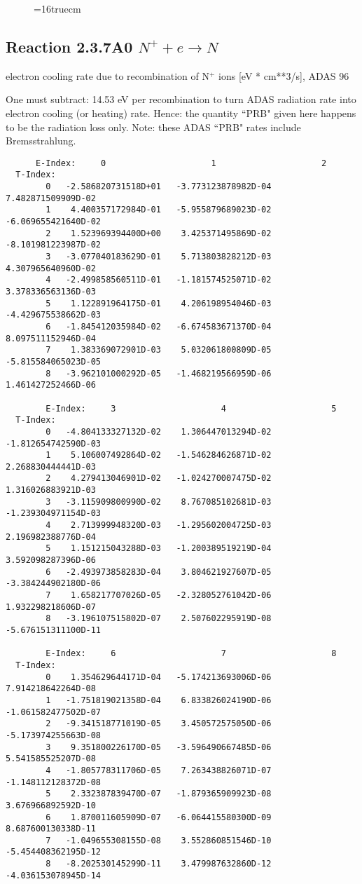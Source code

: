 \documentclass[12pt,dvipdfmx]{article}
\begin{document}
\begin{figure} \label{2.3.6rl}
\epsfxsize=16truecm
\end{figure}


\subsection{
  Reaction 2.3.7A0  $N^+ + e \rightarrow N   $
}
electron cooling rate due to recombination of N$^+$ ions [eV *
cm**3/s], ADAS 96

One must subtract: 14.53 eV per recombination to turn ADAS radiation
rate into electron cooling (or heating) rate. Hence: the quantity
``PRB" given here happens to be the radiation loss only. Note: these
ADAS ``PRB" rates include Bremsstrahlung.

\begin{small}\begin{verbatim}
      E-Index:     0                     1                     2
  T-Index:
        0   -2.586820731518D+01   -3.773123878982D-04    7.482871509909D-02
        1    4.400357172984D-01   -5.955879689023D-02   -6.069655421640D-02
        2    1.523969394400D+00    3.425371495869D-02   -8.101981223987D-02
        3   -3.077040183629D-01    5.713803828212D-03    4.307965640960D-02
        4   -2.499858560511D-01   -1.181574525071D-02    3.378336563136D-03
        5    1.122891964175D-01    4.206198954046D-03   -4.429675538662D-03
        6   -1.845412035984D-02   -6.674583671370D-04    8.097511152946D-04
        7    1.383369072901D-03    5.032061800809D-05   -5.815584065023D-05
        8   -3.962101000292D-05   -1.468219566959D-06    1.461427252466D-06

        E-Index:     3                     4                     5
  T-Index:
        0   -4.804133327132D-02    1.306447013294D-02   -1.812654742590D-03
        1    5.106007492864D-02   -1.546284626871D-02    2.268830444441D-03
        2    4.279413046901D-02   -1.024270007475D-02    1.316026883921D-03
        3   -3.115909800990D-02    8.767085102681D-03   -1.239304971154D-03
        4    2.713999948320D-03   -1.295602004725D-03    2.196982388776D-04
        5    1.151215043288D-03   -1.200389519219D-04    3.592098287396D-06
        6   -2.493973858283D-04    3.804621927607D-05   -3.384244902180D-06
        7    1.658217707026D-05   -2.328052761042D-06    1.932298218606D-07
        8   -3.196107515802D-07    2.507602295919D-08   -5.676151311100D-11

        E-Index:     6                     7                     8
  T-Index:
        0    1.354629644171D-04   -5.174213693006D-06    7.914218642264D-08
        1   -1.751819021358D-04    6.833826024190D-06   -1.061582477502D-07
        2   -9.341518771019D-05    3.450572575050D-06   -5.173974255663D-08
        3    9.351800226170D-05   -3.596490667485D-06    5.541585525207D-08
        4   -1.805778311706D-05    7.263438826071D-07   -1.148112128372D-08
        5    2.332387839470D-07   -1.879365909923D-08    3.676966892592D-10
        6    1.870011605909D-07   -6.064415580300D-09    8.687600130338D-11
        7   -1.049655308155D-08    3.552860851546D-10   -5.454408362195D-12
        8   -8.202530145299D-11    3.479987632860D-12   -4.036153078945D-14


\end{verbatim}
\end{small}
\end{document}
